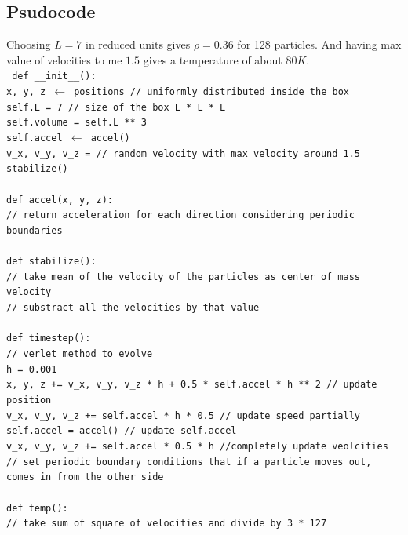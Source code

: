 \documentclass[12pt, a4paper]{article}
\begin{document}
	\newpage
	\subsection{Psudocode}
	Choosing $L = 7$ in reduced units gives $\rho = 0.36$ for 128 particles. And having max value of velocities to me $1.5$ gives a temperature of about $80 K$.\\
	
	\noindent\texttt{
	\noindent def \_\_init\_\_():\\
	x, y, z $\leftarrow$ positions // uniformly distributed inside the box\\
	self.L = 7  // size of the box L * L * L\\
	self.volume = self.L ** 3 \\
	self.accel $\leftarrow$ accel() \\ 
	v\_x, v\_y, v\_z = // random velocity with max velocity around 1.5\\ 
	stabilize()\\ \\
	def accel(x, y, z):\\
		// return acceleration for each direction considering periodic boundaries\\ \\
	def stabilize():\\
		// take mean of the velocity of the particles as center of mass velocity\\
		// substract all the velocities by that value\\ \\
	def timestep():\\
		// verlet method to evolve\\
		h = 0.001\\
		x, y, z += v\_x, v\_y, v\_z * h + 0.5 * self.accel * h ** 2 // update position\\
		v\_x, v\_y, v\_z += self.accel * h * 0.5 // update speed partially\\
		self.accel = accel() // update self.accel \\
		v\_x, v\_y, v\_z += self.accel * 0.5 * h //completely update veolcities\\ 
		// set periodic boundary conditions that if a particle moves out, comes in from the other side\\ \\
		def temp():\\
		// take sum of square of velocities and divide by 3 * 127 \\ \\
	}
\end{document}
